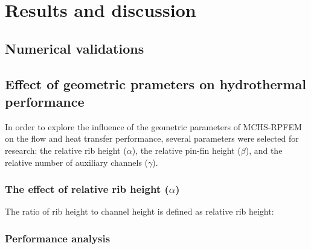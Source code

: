 %
% 
%

\section{Results and discussion}

\subsection{Numerical validations}


\subsection{Effect of geometric prameters on hydrothermal performance}

In order to explore the influence of the geometric parameters of MCHS-RPFEM on the flow and heat transfer performance, several parameters were selected for research: the relative rib height ($\alpha$), the relative pin-fin height ($\beta$), and the relative number of auxiliary channels ($\gamma$).




\subsubsection{The effect of relative rib height  ($\alpha$)}
The ratio of rib height to channel height is defined as relative rib height:




\subsubsection{Performance analysis}